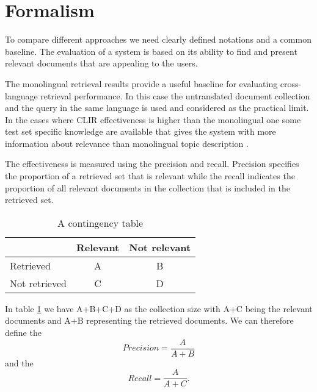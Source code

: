 \documentclass[journal]{IEEEtran}
\begin{document}
\section{Formalism}
To compare different approaches we need clearly defined notations and a common baseline.
The evaluation of a system is based on its ability to find and present relevant documents that are appealing to the users.

The monolingual retrieval results provide a useful baseline for evaluating cross-language retrieval performance.
In this case the untranslated document collection and the query in the same language is used and considered as the practical limit.
In the cases where CLIR effectiveness is higher than the monolingual one some test set specific knowledge are available that gives the system with more information about relevance than monolingual topic description \cite{xu00}.

The effectiveness is measured using the precision and recall.
Precision specifies the proportion of a retrieved set that is relevant while the recall indicates the proportion of all relevant documents in the collection that is included in the retrieved set.

\begin{table}[h]
\caption{A contingency table}
\label{contTable}
\begin{center}
\begin{tabular}{ | l | c | c | }
	\hline
				& Relevant	& Not relevant	\\ \hline
	Retrieved		& A		& B			\\ \hline
	Not retrieved	& C		& D			\\
	\hline
\end{tabular}
\end{center}
\end{table}

In table \ref{contTable} we have A+B+C+D as the collection size with A+C being the relevant documents and A+B representing the retrieved documents.
We can therefore define the
\begin{equation}
\label{precision}
Precision = \frac{A}{A+B}
\end{equation}
and the
\begin{equation}
\label{recall}
Recall = \frac{A}{A+C}.
\end{equation}
\end{document}
